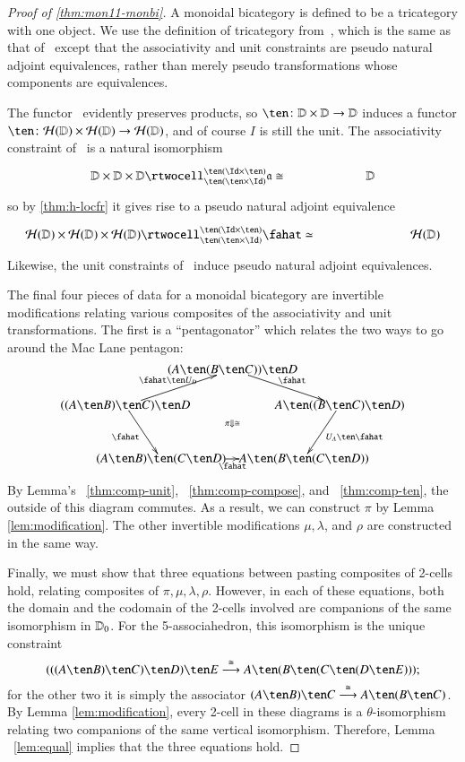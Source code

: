 \documentclass{amsart}
\begin{document}
\begin{proof}[Proof of \autoref{thm:mon11-monbi}]
  A monoidal bicategory is defined to be a tricategory with one
  object.  We use the definition of tricategory
  from~\cite{nick:tricats}, which is the same as that
  of~\cite{gps:tricats} except that the associativity and unit
  constraints are pseudo natural adjoint equivalences, rather than
  merely pseudo transformations whose components are equivalences.

  The functor \cH\ evidently preserves products, so $\ten\maps
  \lD\times\lD\to\lD$ induces a functor $\ten\maps
  \cH(\lD)\times\cH(\lD)\to \cH(\lD)$, and of course $I$ is still the
  unit.  The associativity constraint of \lD\ is a natural isomorphism
  \[\vcenter{\xymatrix@C=5pc{\lD\times\lD\times\lD \rtwocell^{\ten
        (\Id\times\ten)}_{\ten(\ten\times\Id)}{\fa\iso} &\lD }}\]
  so by \autoref{thm:h-locfr} it gives rise to a pseudo natural
  adjoint equivalence
  \[\vcenter{\xymatrix@C=6pc{\cH(\lD)\times\cH(\lD)\times\cH(\lD) \rtwocell^{\ten
        (\Id\times\ten)}_{\ten(\ten\times\Id)}{\fahat\eqv} &\cH(\lD) }}\]
  Likewise, the unit constraints of \lD\ induce pseudo natural adjoint
  equivalences.

  The final four pieces of data for a monoidal bicategory are
  invertible modifications relating various composites of the
  associativity and unit transformations.  The first is a
  ``pentagonator'' which relates the two ways to go around the Mac
  Lane pentagon:
  \[\xy
  (-10,0)*{((A\ten B)\ten C)\ten D}="A";
  (20,10)*{(A\ten (B\ten C))\ten D}="B";
  (50,0)*{A\ten ((B\ten C)\ten D)}="C";
  (0,-15)*{(A\ten B)\ten (C\ten D)}="D";
  (40,-15)*{A\ten (B\ten (C\ten D))}="E";
  (20,-5)*{\scriptstyle\pi\Downarrow\iso};
  \ar "B";"A";^{\fahat\ten U_D}
  \ar "C";"B";^{\fahat}
  \ar "D";"A";_{\fahat}
  \ar "E";"D";_{\fahat}
  \ar "E";"C";^{U_A\ten \fahat}
  \endxy
  \]
By Lemma's ~\ref{thm:comp-unit},  ~\ref{thm:comp-compose}, and ~\ref{thm:comp-ten}, the outside of this diagram commutes.  
 As a result, we can construct $\pi$ by Lemma \ref{lem:modification}. The other invertible modifications $\mu, \lambda$, and $\rho$ are constructed in the same way.

  Finally, we must show that three equations between pasting
  composites of 2-cells hold, relating composites of
  $\pi,\mu,\lambda,\rho$.  However, in each of these equations, both
  the domain and the codomain of the 2-cells involved are companions
  of the same isomorphism in $\mathbb{D}_0$.  For the 5-associahedron, this
  isomorphism is the unique constraint
  \[(((A\ten B)\ten C)\ten D)\ten E \too[\iso] A\ten (B\ten (C\ten
  (D\ten E)));
  \]
  for the other two it is simply the associator $(A\ten B)\ten C
  \too[\iso] A\ten (B\ten C)$.  By Lemma \ref{lem:modification},
  every 2-cell in these diagrams is a $\theta$-isomorphism relating
  two companions of the same vertical isomorphism.  Therefore, Lemma ~\ref{lem:equal} implies that the three equations hold.
\end{proof}
\end{document}
